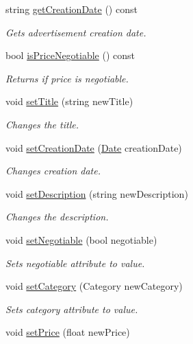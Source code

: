 \begin{DoxyCompactItemize}
string \hyperlink{class_advertisement_aae882e292b1ddcad797df1d4b4766073}{get\+Creation\+Date} () const 
\begin{DoxyCompactList}\small\item\em Gets advertisement creation date. \end{DoxyCompactList}\item 
bool \hyperlink{class_advertisement_a872ed609f23386fa5b26913a1d78036a}{is\+Price\+Negotiable} () const 
\begin{DoxyCompactList}\small\item\em Returns if price is negotiable. \end{DoxyCompactList}\item 
void \hyperlink{class_advertisement_a22bc67410075fb1d7121ebe641da460e}{set\+Title} (string new\+Title)
\begin{DoxyCompactList}\small\item\em Changes the title. \end{DoxyCompactList}\item 
void \hyperlink{class_advertisement_a6313190818f1e4177bedeab6077e8fd7}{set\+Creation\+Date} (\hyperlink{class_date}{Date} creation\+Date)
\begin{DoxyCompactList}\small\item\em Changes creation date. \end{DoxyCompactList}\item 
void \hyperlink{class_advertisement_acaf414adece9bb3ca2077354e15ab626}{set\+Description} (string new\+Description)
\begin{DoxyCompactList}\small\item\em Changes the description. \end{DoxyCompactList}\item 
void \hyperlink{class_advertisement_a99c97180458c86d517cbbf35d960994f}{set\+Negotiable} (bool negotiable)
\begin{DoxyCompactList}\small\item\em Sets negotiable attribute to value. \end{DoxyCompactList}\item 
void \hyperlink{class_advertisement_ad9ba4dc7b74aea1e4bdd12d60322453c}{set\+Category} (Category new\+Category)
\begin{DoxyCompactList}\small\item\em Sets category attribute to value. \end{DoxyCompactList}\item 
void \hyperlink{class_advertisement_af47b69a36414d09f24bc2e9173e4ab8b}{set\+Price} (float new\+Price)

\end{DoxyCompactItemize}
